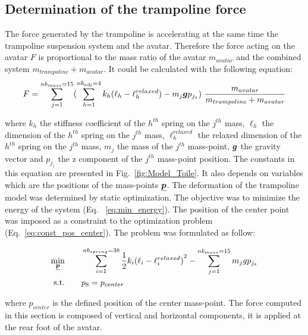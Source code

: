 \subsection{Determination of the trampoline force}\label{subsec:2c}

The force generated by the trampoline is accelerating at the same time the trampoline suspension system and the avatar.
Therefore the force acting on the avatar $F$ is proportional to the mass ratio of the avatar $m_{avatar}$ and the combined system $m_{trampoline} + m_{avatar}$.
It could be calculated with the following equation:
\[
F = \sum_{j=1}^{nb_{mass}=15} ( \sum_{h=1}^{nb_{adj}=4} k_h {(\ell_h - {\ell}^{relaxed}_h)} - m_j \bm{g}p_{j_z}) ~ \frac{m_{avatar}}{m_{trampoline} + m_{avatar} }  \label{eq:Force_trampo}
\]

\noindent where ${k_h}$ the stiffness coefficient of the $h^{th}$ spring on the $j^{th}$ mass, $\ell_h$ the dimension of the $h^{th}$ spring on the $j^{th}$ mass, ${\ell}^{relaxed}_h$ the relaxed dimension of the $h^{th}$ spring on the $j^{th}$ mass, $m_j$ the mass of the $j^{th}$ mass-point,  $\bm{g}$ the gravity vector and $p_{j_z}$ the z component of the $j^{th}$ mass-point position.
The constants in this equation are presented in Fig.~\ref{fig:Model_Toile}.
It also depends on variables which are the positions of the mass-points $\underline{\bm{p}}$.
The deformation of the trampoline model was determined by static optimization.
The objective was to minimize the energy of the system (Eq. ~\ref{eq:min_energy}).
The position of the center point was imposed as a constraint to the optimization problem (Eq.~\ref{eq:const_pos_center}).
The problem was formulated as follow:  

\begin{subequations}
\begin{align}
 \underset{\substack{\underline{\bm{p}}}}{\min} \hspace{2em} & \sum_{i=1}^{nb_{spring}=38} \dfrac{1}{2} k_i {(\ell_i - {\ell}^{relaxed}_i)}^{2} - \sum_{j=1}^{nb_{mass}=15} m_j g p_{j_z} \label{eq:min_energy} \\ 
   \text{s.t.}  \hspace{2em}  & p_{8} = p_{center} \label{eq:const_pos_center}
\end{align}
\end{subequations}

\noindent where $p_{center}$ is the defined position of the center mass-point.
The force computed in this section is composed of vertical and horizontal components, it is applied at the rear foot of the avatar.

